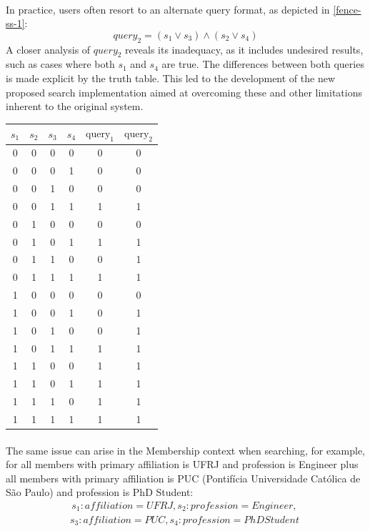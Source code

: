 \paragraph{}In practice, users often resort to an alternate query format, as depicted in \autoref{fence-ss-1}:
\begin{equation}
query_2 = (s_1 \lor s_3) \land (s_2 \lor s_4)
\end{equation}
\noindent
A closer analysis of $query_2$ reveals its inadequacy, as it includes undesired results, such as cases where both $s_1$ and $s_4$ are true. The differences between both queries is made explicit by the truth table. This led to the development of the new proposed search implementation aimed at overcoming these and other limitations inherent to the original system. 
\begin{center}
\begin{tabular}{|c|c|c|c||c|c|}
\hline
\( s_1 \) & \( s_2 \) & \( s_3 \) & \( s_4 \) & \( \text{query}_1 \) & \( \text{query}_2 \) \\
\hline
0 & 0 & 0 & 0 & 0 & 0 \\
0 & 0 & 0 & 1 & 0 & 0 \\
0 & 0 & 1 & 0 & 0 & 0 \\
0 & 0 & 1 & 1 & 1 & 1 \\
0 & 1 & 0 & 0 & 0 & 0 \\
0 & 1 & 0 & 1 & 1 & 1 \\
0 & 1 & 1 & 0 & 0 & 1 \\
0 & 1 & 1 & 1 & 1 & 1 \\
1 & 0 & 0 & 0 & 0 & 0 \\
1 & 0 & 0 & 1 & 0 & 1 \\
1 & 0 & 1 & 0 & 0 & 1 \\
1 & 0 & 1 & 1 & 1 & 1 \\
1 & 1 & 0 & 0 & 1 & 1 \\
1 & 1 & 0 & 1 & 1 & 1 \\
1 & 1 & 1 & 0 & 1 & 1 \\
1 & 1 & 1 & 1 & 1 & 1 \\
\hline
\end{tabular}
\end{center}


\paragraph{}The same issue can arise in the Membership context when searching, for example, for all members with primary affiliation is UFRJ and profession is Engineer plus all members with primary affiliation is PUC (Pontifícia Universidade Católica de São Paulo) and profession is PhD Student:
\begin{equation}
\begin{split}
s_1: affiliation = UFRJ,
s_2: profession = Engineer, \
\end{split}
\end{equation}
\begin{equation}
\begin{split}
s_3: affiliation = PUC,
s_4: profession = PhD Student \
\end{split}
\end{equation}

